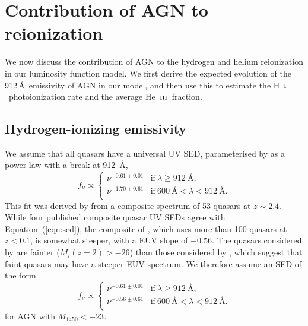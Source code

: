\documentclass[fleqn,usenatbib]{mnras}
\def\HI{\hbox{H~$\scriptstyle\rm I$}}
\def\HeIII{\hbox{He~$\scriptstyle\rm III$}}
\def\HeIII{\hbox{He~$\scriptstyle\rm III$}}
\begin{document}
      \section{Contribution of AGN to reionization}
      \label{sec:reion}

      We now discuss the contribution of AGN to the hydrogen and helium
      reionization in our luminosity function model.  We first derive the
      expected evolution of the 912\,\AA\ emissivity of AGN in our model,
      and then use this to estimate the \HI\ photoionization rate and the
      average \HeIII\ fraction.

      \subsection{Hydrogen-ionizing emissivity}
      \label{sec:e912}

      We assume that all quasars have a universal UV SED, parameterised by
      \citet{2015MNRAS.449.4204L} as a power law with a break at 912~{\AA},
      \begin{equation}
        f_\nu\propto\begin{cases}
        \nu^{-0.61\pm 0.01} & \text{if}~\lambda\geq 912~\text{\AA},\\
        \nu^{-1.70\pm 0.61} & \text{if}~600~\text{\AA}<\lambda<912~\text{\AA}.\\                
        \end{cases}
        \label{eqn:sed}
      \end{equation}
      This fit was derived by \citet{2015MNRAS.449.4204L} from a composite
      spectrum of 53 quasars at $z\sim 2.4$.  While four published composite
      quasar UV SEDs \citep{2002ApJ...565..773T, 2001AJ....122..549V,
        2012ApJ...752..162S, 2014ApJ...794...75S} agree with
      Equation~(\ref{eqn:sed}), the composite of
      \citet{2004ApJ...615..135S}, which uses more than 100 quasars at
      $z<0.1$, is somewhat steeper, with a EUV slope of $-0.56$.  The
      quasars considered by \citet{2004ApJ...615..135S} are fainter
      ($M_i(z=2)>-26$) than those considered by \citet{2015MNRAS.449.4204L},
      which suggest that faint quasars may have a steeper EUV spectrum.  We
      therefore assume an SED of the form
      \begin{equation}
        f_\nu\propto\begin{cases}
        \nu^{-0.61\pm 0.01} & \text{if}~\lambda\geq 912~\text{\AA},\\
        \nu^{-0.56\pm 0.61} & \text{if}~600~\text{\AA}<\lambda<912~\text{\AA}.\\                
        \end{cases}
        \label{eqn:sed_faint}
      \end{equation}
      for AGN with $M_{1450}<-23$.
\end{document}
